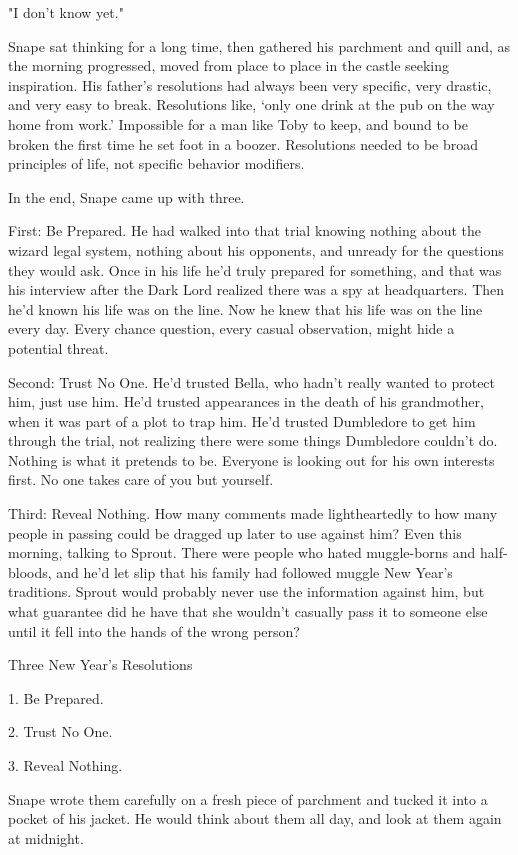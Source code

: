"I don't know yet."

Snape sat thinking for a long time, then gathered his parchment and quill and, as the morning progressed, moved from place to place in the castle seeking inspiration. His father's resolutions had always been very specific, very drastic, and very easy to break. Resolutions like, `only one drink at the pub on the way home from work.' Impossible for a man like Toby to keep, and bound to be broken the first time he set foot in a boozer. Resolutions needed to be broad principles of life, not specific behavior modifiers.

In the end, Snape came up with three.

First: Be Prepared. He had walked into that trial knowing nothing about the wizard legal system, nothing about his opponents, and unready for the questions they would ask. Once in his life he'd truly prepared for something, and that was his interview after the Dark Lord realized there was a spy at headquarters. Then he'd known his life was on the line. Now he knew that his life was on the line every day. Every chance question, every casual observation, might hide a potential threat.

Second: Trust No One. He'd trusted Bella, who hadn't really wanted to protect him, just use him. He'd trusted appearances in the death of his grandmother, when it was part of a plot to trap him. He'd trusted Dumbledore to get him through the trial, not realizing there were some things Dumbledore couldn't do. Nothing is what it pretends to be. Everyone is looking out for his own interests first. No one takes care of you but yourself.

Third: Reveal Nothing. How many comments made lightheartedly to how many people in passing could be dragged up later to use against him? Even this morning, talking to Sprout. There were people who hated muggle-borns and half-bloods, and he'd let slip that his family had followed muggle New Year's traditions. Sprout would probably never use the information against him, but what guarantee did he have that she wouldn't casually pass it to someone else until it fell into the hands of the wrong person?

Three New Year's Resolutions

1. Be Prepared.

2. Trust No One.

3. Reveal Nothing.

Snape wrote them carefully on a fresh piece of parchment and tucked it into a pocket of his jacket. He would think about them all day, and look at them again at midnight.


